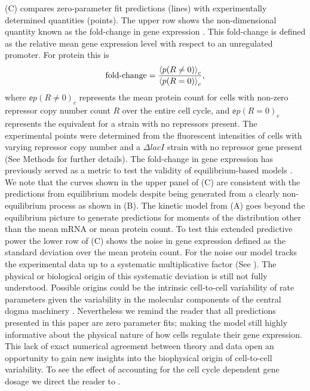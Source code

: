(C) compares zero-parameter fit predictions (lines) with
experimentally determined quantities (points). The upper row shows the
non-dimensional quantity known as the fold-change in gene expression
\cite{Garcia2011c}. This fold-change is defined as the relative mean gene
expression level with respect to an unregulated promoter. For protein this is
\begin{equation}
	\text{fold-change} = {\left\langle p(R \neq 0) \right\rangle_c \over \left\langle p(R = 0) \right\rangle_c},
\end{equation}
where $\ee{p(R \neq 0)}_c$ represents the mean protein count for cells with
non-zero repressor copy number count $R$ over the entire cell cycle, and
$\ee{p(R = 0)}_c$ represents the equivalent for a strain with no repressors
present. The experimental points were determined from the fluorescent
intensities of cells with varying repressor copy number and a $\Delta lacI$
strain with no repressor gene present (See Methods for further details). The
fold-change in gene expression has previously served as a metric to test the
validity of equilibrium-based models \cite{Phillips2015}. We note that the
curves shown in the upper panel of (C) are consistent
with the predictions from equilibrium models \cite{Razo-Mejia2018} despite
being generated from a clearly non-equilibrium process as shown in
(B). The kinetic model from (A)
goes beyond the equilibrium picture to generate predictions for moments of the
distribution other than the mean mRNA or mean protein count. To test this
extended predictive power the lower row of (C) shows the
noise in gene expression defined as the standard deviation over the mean
protein count. For the noise our model tracks the experimental data up to a
systematic multiplicative factor (See ). The physical or
biological origin of this systematic deviation is still not fully understood.
Possible origins could be the intrinsic cell-to-cell variability of rate
parameters given the variability in the molecular components of the central
dogma machinery \cite{Jones2014a}. Nevertheless we remind the reader that all
predictions presented in this paper are zero parameter fits; making the model 
still highly informative about the physical nature of how cells regulate their
gene expression. This lack of exact numerical agreement between theory and data
open an opportunity to gain new insights into the biophysical origin of
cell-to-cell variability. To see the effect of accounting for the cell cycle
dependent gene dosage we direct the reader to .

